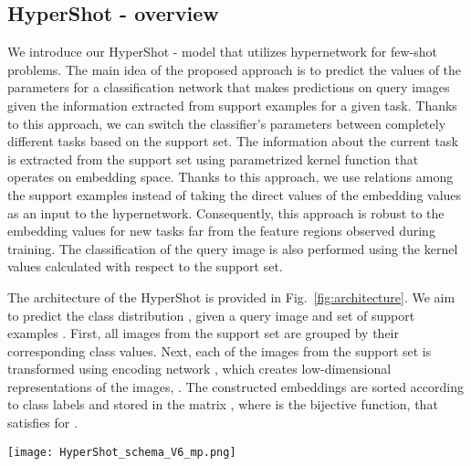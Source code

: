 \documentclass[nohyperref]{article}
\def\our{HyperShot}
\theoremstyle{plain}
\theoremstyle{definition}
\theoremstyle{remark}
\begin{document}
\subsection{\our{} - overview}

We introduce our {\our{}} - model that utilizes hypernetwork for few-shot problems. The main idea of the proposed approach is to predict the values of the parameters for a classification network that makes predictions on query images given the information extracted from support examples for a given task. Thanks to this approach, we can switch the classifier's parameters between completely different tasks based on the support set. The information about the current task is extracted from the support set using parametrized kernel function that operates on embedding space. Thanks to this approach, we use relations among the support examples instead of taking the direct values of the embedding values as an input to the hypernetwork. Consequently, this approach is robust to the embedding values for new tasks far from the feature regions observed during training. The classification of the query image is also performed using the kernel values calculated with respect to the support set.     

The architecture of the \our{} is provided in Fig.~\ref{fig:architecture}. We aim to predict the class distribution , given a query image  and set of support examples . First, all images from the support set are grouped by their corresponding class values. Next, each of the images  from the support set is transformed using encoding network , which creates low-dimensional representations of the images, . The constructed embeddings are sorted according to class labels and stored in the matrix , where  is the bijective function, that satisfies  for . 

\begin{figure*}[t]
    \vskip 0.2in
    \begin{center}
    \centerline{\texttt{[image: HyperShot\_schema\_V6\_mp.png]}}
    \caption{The general architecture of \our{.} First, the examples from a support set are sorted according to the corresponding class labels and transformed by encoding network   to obtain the matrix of ordered embeddings of the support examples, . The low-dimensional representations stored in  are further used to compute kernel matrix . The values of the kernel matrix are passed to the hypernetwork  that creates the parameters  for the target classification module . The query image  is processed by encoder , and the vector of kernel values  is calculated between query embedding  and the corresponding representations of support examples, . The kernel vector  is further passed to target model  to obtain the probability distribution for the considered classes.   } 
    \label{fig:architecture}
    \end{center}
    \vskip -0.2in
\end{figure*}
\end{document}
